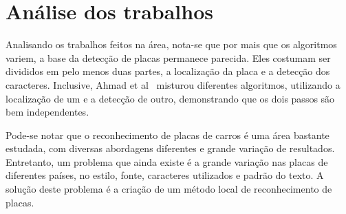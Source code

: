\section{Análise dos trabalhos}

Analisando os trabalhos feitos na área, nota-se que por mais que os algoritmos variem,
a base da detecção de placas permanece parecida. Eles costumam ser divididos em pelo
menos duas partes, a localização da placa e a detecção dos caracteres. Inclusive, Ahmad et al~\cite{ahmad2015automatic}
misturou diferentes algoritmos, utilizando a localização de um e a detecção de
outro, demonstrando que os dois passos são bem independentes.

Pode-se notar que o reconhecimento de placas de carros é uma área bastante estudada,
com diversas abordagens diferentes e grande variação de resultados. Entretanto, um problema que ainda existe é a grande variação nas placas de diferentes países, no estilo, fonte, caracteres utilizados e padrão do texto. A solução deste problema é a criação de um método local de reconhecimento de placas.
